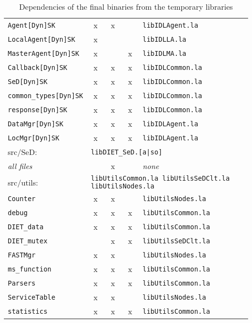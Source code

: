 \begin{table}[h]
\begin{tabular}[c]{|l|c|c|c|l|}
  \texttt{Agent[Dyn]SK}           & x & x &   & \texttt{libIDLAgent.la}\\
  \texttt{LocalAgent[Dyn]SK}      & x &   &   & \texttt{libIDLLA.la}\\
  \texttt{MasterAgent[Dyn]SK}     & x &   & x & \texttt{libIDLMA.la}\\
  \texttt{Callback[Dyn]SK}        & x & x & x & \texttt{libIDLCommon.la}\\
  \texttt{SeD[Dyn]SK}             & x & x & x & \texttt{libIDLCommon.la}\\
  \texttt{common\_types[Dyn]SK}   & x & x & x & \texttt{libIDLCommon.la}\\
  \texttt{response[Dyn]SK}        & x & x & x & \texttt{libIDLCommon.la}\\
  \texttt{DataMgr[Dyn]SK}        & x & x & x & \texttt{libIDLAgent.la}\\
  \texttt{LocMgr[Dyn]SK}        & x & x & x & \texttt{libIDLAgent.la}\\[5pt]
  \hline


  \multicolumn{1}{|l}{\textsf{src/SeD}:} &
  \multicolumn{4}{l|}{\texttt{libDIET\_SeD.[a|so]}}\\[5pt]

  \textit{all files}              &   & x &   & \emph{none}\\[5pt]
  \hline


  \multicolumn{1}{|l}{\textsf{src/utils}:} &
  \multicolumn{4}{l|}{\texttt{libUtilsCommon.la 
                             libUtilsSeDClt.la  libUtilsNodes.la}}\\[5pt]

  \texttt{Counter}                & x & x &   & \texttt{libUtilsNodes.la}\\
  \texttt{debug}                  & x & x & x & \texttt{libUtilsCommon.la}\\
  \texttt{DIET\_data}             & x & x & x & \texttt{libUtilsCommon.la}\\
  \texttt{DIET\_mutex}            &   & x & x & \texttt{libUtilsSeDClt.la}\\
  \texttt{FASTMgr}                & x & x &   & \texttt{libUtilsNodes.la}\\
  \texttt{ms\_function}           & x & x & x & \texttt{libUtilsCommon.la}\\
  \texttt{Parsers}                & x & x & x & \texttt{libUtilsCommon.la}\\
  \texttt{ServiceTable}           & x & x &   & \texttt{libUtilsNodes.la}\\
  \texttt{statistics}             & x & x & x & \texttt{libUtilsCommon.la}\\[5pt]
  \hline
 

 \end{tabular}
 \caption{Dependencies of the final binaries from the temporary libraries}
 \label{t:dep}
\end{table}


